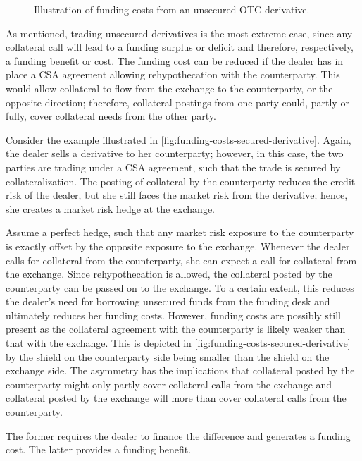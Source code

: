 \documentclass[main.tex]{subfiles}
\begin{document}
        \begin{figure}
            \centering
            \resizebox{\textwidth}{!}{%
            \begin{tikzpicture}
                
            \end{tikzpicture}        
            }   
            \caption{Illustration of funding costs from an unsecured OTC derivative.}
            \label{fig:funding-costs-unsecured-derivative}
        \end{figure}

        As mentioned, trading unsecured derivatives is the most extreme case,
        since any collateral call will lead to a funding surplus or deficit 
        and therefore, respectively, a funding benefit or cost.
        The funding cost can be reduced if the dealer has in place 
        a CSA agreement allowing rehypothecation with the counterparty.
        This would allow collateral to flow from the exchange to the counterparty, 
        or the opposite direction;
        therefore, collateral postings from one party could, partly or fully, 
        cover collateral needs from the other party.

        \begin{example}
        Consider the example illustrated in \cref{fig:funding-costs-secured-derivative}.
        Again, the dealer sells a derivative to her counterparty;
        however, in this case, the two parties are trading under a CSA agreement, 
        such that the trade is secured by collateralization.
        The posting of collateral by the counterparty reduces the credit risk of the dealer,
        but she still faces the market risk from the derivative;
        hence, she creates a market risk hedge at the exchange.
        
        Assume a perfect hedge, such that any market risk exposure to the counterparty 
        is exactly offset by the opposite exposure to the exchange.
        Whenever the dealer calls for collateral from the counterparty,
        she can expect a call for collateral from the exchange.
        Since rehypothecation is allowed,
        the collateral posted by the counterparty can be passed on to the exchange.
        To a certain extent, this reduces the dealer's need for borrowing unsecured funds from the funding desk
        and ultimately reduces her funding costs.
        However, funding costs are possibly still present as
        the collateral agreement with the counterparty is likely weaker than that with the exchange. 
        This is depicted in \cref{fig:funding-costs-secured-derivative} 
        by the shield on the counterparty side being smaller than the shield on the exchange side.
        The asymmetry has the implications that 
        collateral posted by the counterparty might only partly cover collateral calls from the exchange 
        and collateral posted by the exchange will more than cover collateral calls from the counterparty.

        The former requires the dealer to finance the difference and generates a funding cost.
        The latter provides a funding benefit.
        \end{example}
\end{document}

